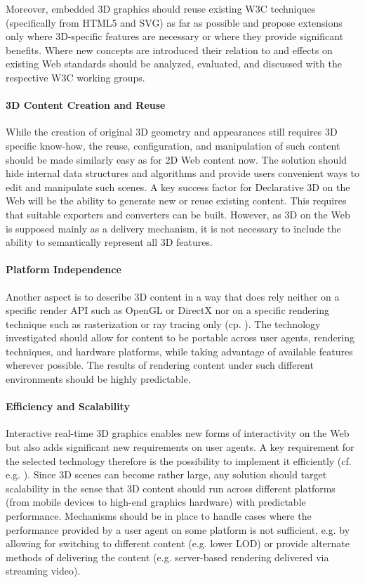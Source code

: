 \documentclass[review]{acmsiggraph}
\begin{document}
Moreover, embedded 3D graphics should reuse existing W3C techniques (specifically from HTML5 and SVG) as far as possible and propose extensions only where 3D-specific features are necessary or where they provide significant benefits. Where new concepts are introduced their relation to and effects on existing Web standards should be analyzed, evaluated, and discussed with the respective W3C working groups.

\paragraph{3D Content Creation and Reuse}
While the creation of original 3D geometry and appearances still requires 3D specific know-how, the reuse, configuration, and manipulation of such content should be made similarly easy as for 2D Web content now. The solution should hide internal data structures and algorithms and provide users convenient ways to edit and manipulate such scenes.
A key success factor for Declarative 3D on the Web will be the ability to generate new or reuse existing content. This requires that suitable exporters and converters can be built. However, as 3D on the Web is supposed mainly as a delivery mechanism, it is not necessary to include the ability to semantically represent all 3D features.

\paragraph{Platform Independence}
Another aspect is to describe 3D content in a way that does rely neither on a specific render API such as OpenGL or DirectX nor on a specific rendering technique such as rasterization or ray tracing only (cp. \cite{Schwenk12}). The technology investigated should allow for content to be portable across user agents, rendering techniques, and hardware platforms, while taking advantage of available features wherever possible. The results of rendering content under such different environments should be highly predictable.

\paragraph{Efficiency and Scalability}
Interactive real-time 3D graphics enables new forms of interactivity on the Web but also adds significant new requirements on user agents. A key requirement for the selected technology therefore is the possibility to implement it efficiently (cf. e.g. \cite{Trevett12}). Since 3D scenes can become rather large, any solution should target scalability in the sense that 3D content should run across different platforms (from mobile devices to high-end graphics hardware) with predictable performance. Mechanisms should be in place to handle cases where the performance provided by a user agent on some platform is not sufficient, e.g. by allowing for switching to different content (e.g. lower LOD) or provide alternate methods of delivering the content (e.g. server-based rendering delivered via streaming video).
\end{document}
